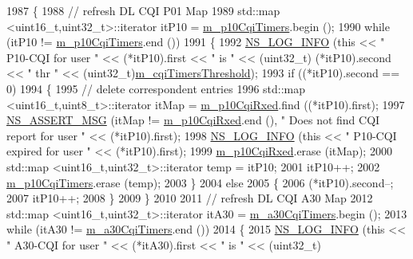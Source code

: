 \begin{DoxyCode}
1987 \{
1988   \textcolor{comment}{// refresh DL CQI P01 Map}
1989   std::map <uint16\_t,uint32\_t>::iterator itP10 = \hyperlink{classns3_1_1TtaFfMacScheduler_a8b66a6a0a7a737e132a112c945ecefa9}{m\_p10CqiTimers}.begin ();
1990   \textcolor{keywordflow}{while} (itP10 != \hyperlink{classns3_1_1TtaFfMacScheduler_a8b66a6a0a7a737e132a112c945ecefa9}{m\_p10CqiTimers}.end ())
1991     \{
1992       \hyperlink{group__logging_gafbd73ee2cf9f26b319f49086d8e860fb}{NS\_LOG\_INFO} (\textcolor{keyword}{this} << \textcolor{stringliteral}{" P10-CQI for user "} << (*itP10).first << \textcolor{stringliteral}{" is "} << (uint32\_t)
      (*itP10).second << \textcolor{stringliteral}{" thr "} << (uint32\_t)\hyperlink{classns3_1_1TtaFfMacScheduler_a3dd8aa322782db3d0f2bbaf9fede6fca}{m\_cqiTimersThreshold});
1993       \textcolor{keywordflow}{if} ((*itP10).second == 0)
1994         \{
1995           \textcolor{comment}{// delete correspondent entries}
1996           std::map <uint16\_t,uint8\_t>::iterator itMap = \hyperlink{classns3_1_1TtaFfMacScheduler_a0846e060ed4b553be784ddba3098eb81}{m\_p10CqiRxed}.find ((*itP10).first);
1997           \hyperlink{assert_8h_aff5ece9066c74e681e74999856f08539}{NS\_ASSERT\_MSG} (itMap != \hyperlink{classns3_1_1TtaFfMacScheduler_a0846e060ed4b553be784ddba3098eb81}{m\_p10CqiRxed}.end (), \textcolor{stringliteral}{" Does not find CQI report
       for user "} << (*itP10).first);
1998           \hyperlink{group__logging_gafbd73ee2cf9f26b319f49086d8e860fb}{NS\_LOG\_INFO} (\textcolor{keyword}{this} << \textcolor{stringliteral}{" P10-CQI expired for user "} << (*itP10).first);
1999           \hyperlink{classns3_1_1TtaFfMacScheduler_a0846e060ed4b553be784ddba3098eb81}{m\_p10CqiRxed}.erase (itMap);
2000           std::map <uint16\_t,uint32\_t>::iterator temp = itP10;
2001           itP10++;
2002           \hyperlink{classns3_1_1TtaFfMacScheduler_a8b66a6a0a7a737e132a112c945ecefa9}{m\_p10CqiTimers}.erase (temp);
2003         \}
2004       \textcolor{keywordflow}{else}
2005         \{
2006           (*itP10).second--;
2007           itP10++;
2008         \}
2009     \}
2010 
2011   \textcolor{comment}{// refresh DL CQI A30 Map}
2012   std::map <uint16\_t,uint32\_t>::iterator itA30 = \hyperlink{classns3_1_1TtaFfMacScheduler_ac0ad6a5aaee1c2c92ae0d73d401b0d2c}{m\_a30CqiTimers}.begin ();
2013   \textcolor{keywordflow}{while} (itA30 != \hyperlink{classns3_1_1TtaFfMacScheduler_ac0ad6a5aaee1c2c92ae0d73d401b0d2c}{m\_a30CqiTimers}.end ())
2014     \{
2015       \hyperlink{group__logging_gafbd73ee2cf9f26b319f49086d8e860fb}{NS\_LOG\_INFO} (\textcolor{keyword}{this} << \textcolor{stringliteral}{" A30-CQI for user "} << (*itA30).first << \textcolor{stringliteral}{" is "} << (uint32\_t)

\end{DoxyCode}
